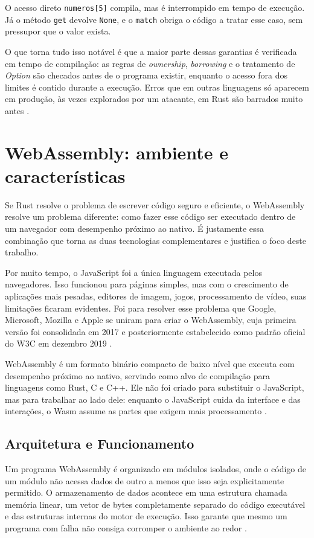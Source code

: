 O acesso direto \texttt{numeros[5]} compila, mas é interrompido em tempo de execução. Já o método \texttt{get} devolve \texttt{None}, e o \texttt{match} obriga o código a tratar esse caso, sem pressupor que o valor exista.

O que torna tudo isso notável é que a maior parte dessas garantias é verificada em tempo de compilação: as regras de \emph{ownership}, \emph{borrowing} e o tratamento de \emph{Option} são checados antes de o programa existir, enquanto o acesso fora dos limites é contido durante a execução. Erros que em outras linguagens só aparecem em produção, às vezes explorados por um atacante, em Rust são barrados muito antes \cite{bugden2022}.
\section{WebAssembly: ambiente e características}

Se Rust resolve o problema de escrever código seguro e eficiente, o WebAssembly resolve um problema diferente: como fazer esse código ser executado dentro de um navegador com desempenho próximo ao nativo. É justamente essa combinação que torna as duas tecnologias complementares e justifica o foco deste trabalho.

Por muito tempo, o JavaScript foi a única linguagem executada pelos navegadores. Isso funcionou para páginas simples, mas com o crescimento de aplicações mais pesadas, editores de imagem, jogos, processamento de vídeo, suas limitações ficaram evidentes. Foi para resolver esse problema que Google, Microsoft, Mozilla e Apple se uniram para criar o WebAssembly, cuja primeira versão foi consolidada em 2017 \cite{haas2018} e posteriormente estabelecido
como padrão oficial do W3C em dezembro 2019 \cite{w3c2019}.

WebAssembly é um formato binário compacto de baixo nível que executa com desempenho próximo ao nativo, servindo como alvo de compilação para linguagens como Rust, C e C++. Ele não foi criado para substituir o JavaScript, mas para trabalhar ao lado dele: enquanto o JavaScript cuida da interface e das interações, o Wasm assume as partes que exigem mais processamento \cite{mdn2026}.

\subsection{Arquitetura e Funcionamento}

Um programa WebAssembly é organizado em módulos isolados, onde o código de um módulo não acessa dados de outro a menos que isso seja explicitamente permitido. O armazenamento de dados acontece em uma estrutura chamada memória linear, um vetor de bytes completamente separado do código executável e das estruturas internas do motor de execução. Isso garante que mesmo um programa com falha não consiga corromper o ambiente ao redor \cite{moric2022}.

